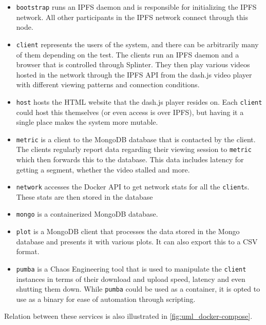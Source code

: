 \begin{itemize}
    \item \texttt{bootstrap} runs an \ac{IPFS} daemon and is responsible for initializing the \ac{IPFS} network. All other participants in the \ac{IPFS} network connect through this node.
    
    \item \texttt{client} represents the users of the system, and there can be arbitrarily many of them depending on the test. The clients run an \ac{IPFS} daemon and a browser that is controlled through Splinter. They then play various videos hosted in the network through the \ac{IPFS} \ac{API} from the dash.js video player with different viewing patterns and connection conditions.
    
    \item \texttt{host} hosts the \ac{HTML} website that the dash.js player resides on. Each \texttt{client} could host this themselves (or even access is over \ac{IPFS}), but having it a single place makes the system more mutable.
    
    \item \texttt{metric} is a client to the MongoDB database that is contacted by the client. The clients regularly report data regarding their viewing session to \texttt{metric} which then forwards this to the database. This data includes latency for getting a segment, whether the video stalled and more.
    
    \item \texttt{network} accesses the Docker \ac{API} to get network stats for all the \texttt{client}s. These stats are then stored in the database
    \item \texttt{mongo} is a containerized MongoDB database.
    
    \item \texttt{plot} is a MongoDB client that processes the data stored in the Mongo database and presents it with various plots. It can also export this to a \ac{CSV} format.
    
    \item \texttt{pumba} is a Chaos Engineering tool that is used to manipulate the \texttt{client} instances in terms of their download and upload speed, latency and even shutting them down. While \texttt{pumba} could be used as a container, it is opted to use as a binary for ease of automation through scripting.
\end{itemize}
Relation between these services is also illustrated in \autoref{fig:uml_docker-compose}.

